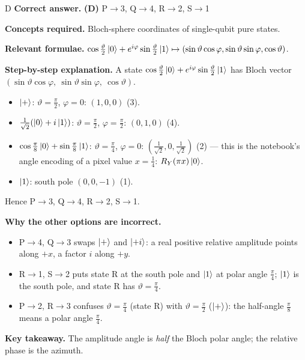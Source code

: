 \documentclass[11pt,a4paper]{article}
\newcommand{\qsep}{\par\vspace{2pt}{\color{black!15}\hrule}\vspace{4pt}}
\begin{document}
\begin{solbox}{D}
\textbf{\color{brand}Correct answer.} \textcolor{okgreen}{\textbf{(D)}} P$\to$3, Q$\to$4, R$\to$2, S$\to$1

\textbf{\color{brand}Concepts required.} Bloch-sphere coordinates of single-qubit pure states.

\textbf{\color{brand}Relevant formulae.} $\cos\frac\vartheta2\ket0 + e^{i\varphi}\sin\frac\vartheta2\ket1 \mapsto (\sin\vartheta\cos\varphi, \sin\vartheta\sin\varphi, \cos\vartheta)$.

\textbf{\color{brand}Step-by-step explanation.} A state $\cos\frac\vartheta2\ket0 + e^{i\varphi}\sin\frac\vartheta2\ket1$ has Bloch vector
$(\sin\vartheta\cos\varphi,\ \sin\vartheta\sin\varphi,\ \cos\vartheta)$.
\begin{itemize}\itemsep0pt
\item $\ket+$: $\vartheta = \frac\pi2$, $\varphi = 0$: $(1, 0, 0)$ (3).
\item $\frac{1}{\sqrt2}(\ket0 + i\ket1)$: $\vartheta = \frac\pi2$, $\varphi = \frac\pi2$: $(0, 1, 0)$ (4).
\item $\cos\frac\pi8\ket0 + \sin\frac\pi8\ket1$: $\vartheta = \frac\pi4$, $\varphi = 0$: $(\frac{1}{\sqrt2}, 0, \frac{1}{\sqrt2})$ (2) --- this is the
notebook's angle encoding of a pixel value $x = \frac14$: $R_Y(\pi x)\ket0$.
\item $\ket1$: south pole $(0, 0, -1)$ (1).
\end{itemize}
Hence P$\to$3, Q$\to$4, R$\to$2, S$\to$1.

\textbf{\color{brand}Why the other options are incorrect.}
\begin{itemize}[leftmargin=2.4em, itemsep=1pt, topsep=2pt]
\item[\textbf{(A)}] P$\to$4, Q$\to$3 swaps $\ket+$ and $\ket{+i}$: a real positive relative amplitude points along $+x$, a factor $i$ along $+y$.
\item[\textbf{(B)}] R$\to$1, S$\to$2 puts state R at the south pole and $\ket1$ at polar angle $\frac\pi4$; $\ket1$ is the south pole, and state R has $\vartheta = \frac\pi4$.
\item[\textbf{(C)}] P$\to$2, R$\to$3 confuses $\vartheta = \frac\pi4$ (state R) with $\vartheta = \frac\pi2$ ($\ket+$): the half-angle $\frac\pi8$ means a polar angle $\frac\pi4$.
\end{itemize}
\textbf{\color{brand}Key takeaway.} The amplitude angle is \emph{half} the Bloch polar angle; the relative phase is the azimuth.
\end{solbox}
\qsep
\end{document}
